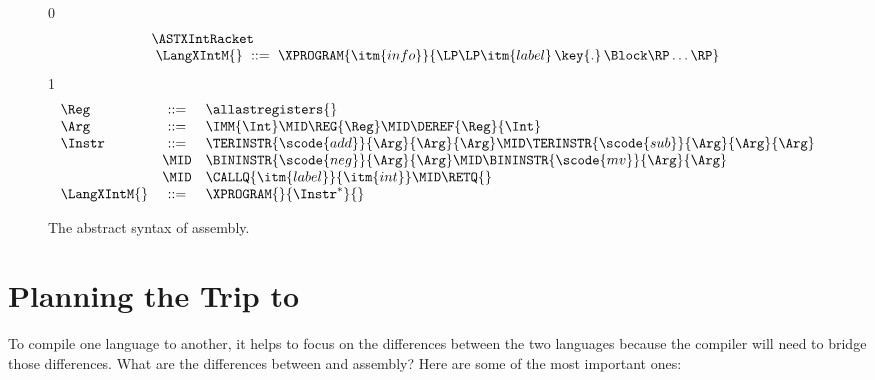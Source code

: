 \documentclass[7x10]{TimesAPriori_MIT}%
\def\racketEd{0}
\def\pythonEd{1}
\def\edition{1}
\newcommand{\pythonColor}[0]{}
\numberwithin{theorem}{chapter}
\numberwithin{definition}{chapter}
\numberwithin{equation}{chapter}
\begin{document}
\begin{figure}[tp]
\begin{tcolorbox}[colback=white]
\small
{\if\edition\racketEd
\[\arraycolsep=3pt
\begin{array}{l}
  \ASTXIntRacket \\
\begin{array}{lcl}
\LangXIntM{} &::= & \XPROGRAM{\itm{info}}{\LP\LP\itm{label} \,\key{.}\, \Block \RP\ldots\RP}
\end{array}
\end{array}
\]
\fi}
{\if\edition\pythonEd\pythonColor
\[
\begin{array}{lcl}
\Reg &::=& \allastregisters{} \\
\Arg &::=&  \IMM{\Int} \MID \REG{\Reg}
   \MID \DEREF{\Reg}{\Int} \\
  \Instr &::=& \TERINSTR{\scode{add}}{\Arg}{\Arg}{\Arg}
               \MID \TERINSTR{\scode{sub}}{\Arg}{\Arg}{\Arg} \\
     &\MID&
            \BININSTR{\scode{neg}}{\Arg}{\Arg} 
            \MID \BININSTR{\scode{mv}}{\Arg}{\Arg} \\
     &\MID& \CALLQ{\itm{label}}{\itm{int}} \MID \RETQ{}
  \\
\LangXIntM{} &::= & \XPROGRAM{}{\Instr^{*}}{}
\end{array}
\]
\fi}
\end{tcolorbox}
\caption{The abstract syntax of \LangXInt{} assembly.}
\label{fig:x86-int-ast}
\end{figure}

\section{Planning the Trip to {\ArchName}}
\label{sec:plan-s0-x86}

To compile one language to another, it helps to focus on the
differences between the two languages because the compiler will need
to bridge those differences. What are the differences between \LangVar{}
and {\ArchName} assembly? Here are some of the most important ones:
\end{document}
